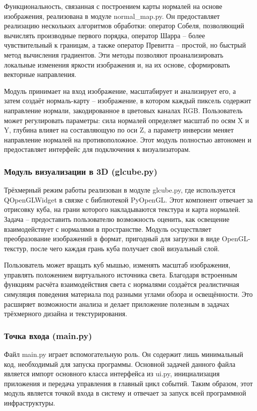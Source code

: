 Функциональность, связанная с построением карты нормалей на основе изображения, реализована в модуле normal\_map.py. Он предоставляет реализацию нескольких алгоритмов обработки: оператор Собеля, позволяющий вычислять производные первого порядка, оператор Шарра -- более чувствительный к границам, а также оператор Превитта -- простой, но быстрый метод вычисления градиентов. Эти методы позволяют проанализировать локальные изменения яркости изображения и, на их основе, сформировать векторные направления.

Модуль принимает на вход изображение, масштабирует и анализирует его, а затем создаёт нормаль-карту -- изображение, в котором каждый пиксель содержит направление нормали, закодированное в цветовых каналах RGB. Пользователь может регулировать параметры: сила нормалей определяет масштаб по осям X и Y, глубина влияет на составляющую по оси Z, а параметр инверсии меняет направление нормалей на противоположное. Этот модуль полностью автономен и предоставляет интерфейс для подключения к визуализаторам.
\subsubsection{Модуль визуализации в 3D (glcube.py)}

Трёхмерный режим работы реализован в модуле glcube.py, где используется QOpenGLWidget в связке с библиотекой PyOpenGL. Этот компонент отвечает за отрисовку куба, на грани которого накладываются текстура и карта нормалей. Задача -- предоставить пользователю возможность оценить, как освещение взаимодействует с нормалями в пространстве. Модуль осуществляет преобразование изображений в формат, пригодный для загрузки в виде OpenGL-текстур, после чего каждая грань куба получает свой визуальный слой.

Пользователь может вращать куб мышью, изменять масштаб изображения, управлять положением виртуального источника света. Благодаря встроенным функциям расчёта взаимодействия света с нормалями создаётся реалистичная симуляция поведения материала под разными углами обзора и освещённости. Это расширяет возможности анализа и делает приложение полезным в задачах трёхмерного дизайна и текстурирования.

\subsubsection{Точка входа (main.py)}

Файл main.py играет вспомогательную роль. Он содержит лишь минимальный код, необходимый для запуска программы. Основной задачей данного файла является импорт основного класса интерфейса из ui.py, инициализация приложения и передача управления в главный цикл событий. Таким образом, этот модуль является точкой входа в систему и отвечает за запуск всей программной инфраструктуры.
